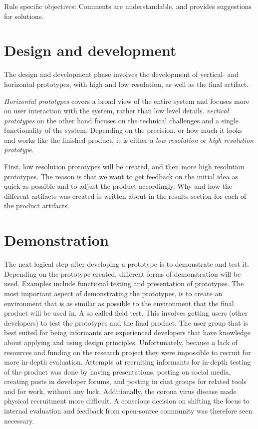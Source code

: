 \documentclass{report}
\begin{document}
Rule specific objectives: 
Comments are understandable, and provides suggestions for solutions.

\section{Design and development}

The design and development phase involves the development of vertical- and horizontal prototypes, with high and low resolution, as well as the final artifact. 

\textit{Horizontal prototypes} covers a broad view of the entire system and focuses more on user interaction with the system, rather than low level details. \textit{vertical prototypes} on the other hand focuses on the technical challenges and a single functionality of the system. Depending on the precision, or how much it looks and works like the finished product, it is either a \textit{low resolution} or \textit{high resolution prototype}. 

First, low resolution prototypes will be created, and then more high resolution prototypes. The reason is that we want to get feedback on the initial idea as quick as possible and to adjust the product accordingly. Why and how the different artifacts was created is written about in the results section for each of the product artifacts.
 
\section{Demonstration}

The next logical step after developing a prototype is to demonstrate and test it. Depending on the prototype created, different forms of demonstration will be used. Examples include functional testing and presentation of prototypes. The most important aspect of demonstrating the prototypes, is to create an environment that is as similar as possible to the environment that the final product will be used in. A so called field test. This involves getting users (other developers) to test the prototypes and the final product. The user group that is best suited for being informants are experienced developers that have knowledge about applying and using design principles. Unfortunately, because a lack of resources and funding on the research project they were impossible to recruit for more in-depth evaluation. Attempts at recruiting informants for in-depth testing of the product was done by having presentations, posting on social media, creating posts in developer forums, and posting in chat groups for related tools and for work, without any luck. Additionally, the corona virus disease made physical recruitment more difficult. A conscious decision on shifting the focus to internal evaluation and feedback from open-source community was therefore seen necessary.     
\end{document}
